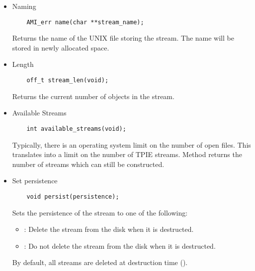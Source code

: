 \begin{itemize}
\item{Naming}

\begin{verbatim}
    AMI_err name(char **stream_name);
\end{verbatim}

Returns the name of the UNIX file storing the stream.  The
name will be stored in newly allocated space.

\item{Length}

\begin{verbatim}
    off_t stream_len(void);
\end{verbatim}

Returns the current number of objects in the stream.

\item{Available Streams}
\begin{verbatim}
    int available_streams(void);    
\end{verbatim}

Typically, there is an operating system limit on the number
of open files. This translates into a limit on the number of
TPIE streams. Method  returns the
number of streams which can still be constructed.

\item{Set persistence}

\begin{verbatim}
    void persist(persistence);
\end{verbatim}

Sets the persistence of the stream to one of the following:
\begin{itemize}
\item {}: Delete the stream from the disk when it is
  destructed.
\item {}: Do not delete the stream from the disk when
  it is destructed.
\end{itemize}

By default, all streams are deleted at destruction time
().
\end{itemize}


